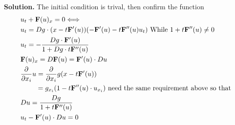 \message{ !name(PDE-hw6-21935004-\unexpanded{谭焱}.tex)}\documentclass[a4paper]{book}
\newenvironment{solution}%
{\noindent\textbf{Solution.}}%
{\qedhere}
\numberwithin{equation}{chapter}
\theoremstyle{definition}
\begin{document}
\begin{solution}
  The initial condition is trival, then confirm the function
  \begin{align*}
    &u_t + \mathbf{F}(u)_x = 0 \Longleftrightarrow \\
    &u_t = D g \cdot (x - t\mathbf{F}^\prime(u))(- \mathbf{F}^\prime(u) - t \mathbf{F}^{\prime \prime}(u) u_t) \textmd{ While } 1 + t \mathbf{F}^{\prime \prime}(u) \neq 0 \\
    &u_t = - \frac{D g \cdot \mathbf{F}^\prime(u)}{1 + D g \cdot t \mathbf{F}^{\prime \prime}(u)} \\
    &\mathbf{F}(u)_x = D \mathbf{F}(u) = \mathbf{F}^\prime(u) \cdot D u \\
    &\frac{\partial}{\partial x_i} u = \frac{\partial}{\partial x_i} g(x - t \mathbf{F}^\prime (u)) \\
    &\qquad \; = g_{x_i} (1 - t \mathbf{F}^{\prime \prime}(u) \cdot u_{x_i}) \textmd{ need the same requirement above so that } \\
    &D u = \frac{D g}{1 + t \mathbf{F}^{\prime \prime}(u)} \\
    &u_t - \mathbf{F}^\prime(u) \cdot D u = 0
  \end{align*}
\end{solution}








\end{document}
